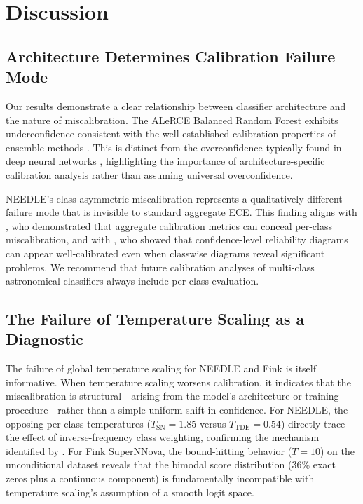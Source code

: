 \documentclass[twocolumn]{aastex631}
\begin{document}
\section{Discussion} \label{sec:discussion}

\subsection{Architecture Determines Calibration Failure Mode}

Our results demonstrate a clear relationship between classifier architecture and the nature of miscalibration. The ALeRCE Balanced Random Forest exhibits underconfidence consistent with the well-established calibration properties of ensemble methods \citep{niculescumizil2005, bostrom2008, loecher2024}. This is distinct from the overconfidence typically found in deep neural networks \citep{guo2017}, highlighting the importance of architecture-specific calibration analysis rather than assuming universal overconfidence.

NEEDLE's class-asymmetric miscalibration represents a qualitatively different failure mode that is invisible to standard aggregate ECE. This finding aligns with \citet{nixon2019}, who demonstrated that aggregate calibration metrics can conceal per-class miscalibration, and with \citet{kull2019}, who showed that confidence-level reliability diagrams can appear well-calibrated even when classwise diagrams reveal significant problems. We recommend that future calibration analyses of multi-class astronomical classifiers always include per-class evaluation.

\subsection{The Failure of Temperature Scaling as a Diagnostic}

The failure of global temperature scaling for NEEDLE and Fink is itself informative. When temperature scaling worsens calibration, it indicates that the miscalibration is structural---arising from the model's architecture or training procedure---rather than a simple uniform shift in confidence. For NEEDLE, the opposing per-class temperatures ($T_{\text{SN}} = 1.85$ versus $T_{\text{TDE}} = 0.54$) directly trace the effect of inverse-frequency class weighting, confirming the mechanism identified by \citet{vandengoorbergh2022}. For Fink SuperNNova, the bound-hitting behavior ($T = 10$) on the unconditional dataset reveals that the bimodal score distribution (36\% exact zeros plus a continuous component) is fundamentally incompatible with temperature scaling's assumption of a smooth logit space.
\end{document}
